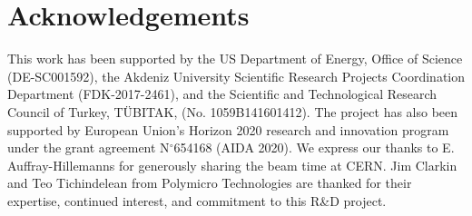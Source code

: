 \documentclass[a4paper,11pt]{article}
\begin{document}

\section{Acknowledgements}
This work has been supported by the US Department of Energy, Office of Science (DE-SC001592), the Akdeniz University Scientific Research Projects Coordination Department (FDK-2017-2461), and the Scientific and Technological Research Council of Turkey, T\"UBITAK, (No. 1059B141601412). The project has also been supported by European Union's Horizon 2020 research and innovation program under the grant agreement N$^\circ$654168 (AIDA 2020). We express our thanks to E. Auffray-Hillemanns for generously sharing the beam time at CERN. Jim Clarkin and Teo Tichindelean from Polymicro Technologies are thanked for their expertise, continued interest, and commitment to this R\&D project.




\end{document}
